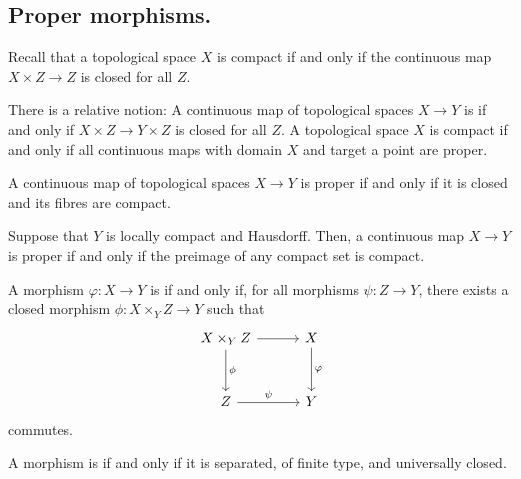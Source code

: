 \documentclass [11 pt, oneside] {article}
\begin{document}
\subsection{Proper morphisms.}
Recall that a topological space $X$ is compact if and only if the continuous map $X\times Z\longrightarrow Z$ is closed for all $Z$.

There is a relative notion: A continuous map of topological spaces $X\longrightarrow Y$ is  if and only if $X\times Z\longrightarrow Y\times Z$ is closed for all $Z$. A topological space $X$ is compact if and only if all continuous maps with domain $X$ and target a point are proper.

\begin{remark}[ ]\label{}\text{}
A continuous map of topological spaces $X\longrightarrow Y$ is proper if and only if it is closed and its fibres are compact.
\end{remark}

\begin{remark}
	Suppose that $Y$ is locally compact and Hausdorff. Then, a continuous map $X\longrightarrow Y$ is proper if and only if the preimage of any compact set is compact. 
\end{remark}

\begin{definition}[ ]\label{}\text{}
A morphism $\varphi : X\longrightarrow Y$ is  if and only if, for all morphisms $\psi : Z\longrightarrow Y$, there exists a closed morphism $\phi:X\times_Y Z\longrightarrow Y$ such that
\[
	\begin{tikzcd}[row sep = 3 em, column sep = 3 em]
		X \times_Y Z \ar[d, "\phi"] \ar[r] & X\ar[d, "\varphi"]\\Z\ar[r,"\psi"] & Y
	\end{tikzcd}	
\]
commutes.
\end{definition}

\begin{definition}[ ]\label{}\text{}
A morphism is  if and only if it is separated, of finite type, and universally closed.
\end{definition}
\end{document}
